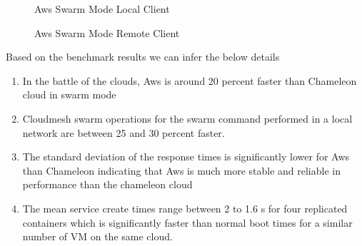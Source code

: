 \documentclass[9pt,twocolumn,twoside]{../../styles/osajnl}
\begin{document}
\begin{figure}[h]
\centering
{}
\caption{Aws Swarm Mode Local Client}
\label{fig:Aws-Swarm-Mode-Local-Client}
\end{figure}


\begin{figure}[h]
\centering
{}
\caption{Aws Swarm Mode Remote Client}
\label{fig:Aws-Swarm-Mode-Remote-Client}
\end{figure}

Based on the benchmark results we can infer the below details
\begin{enumerate}
\item  In the battle of the clouds, Aws is around 20 percent faster than Chameleon cloud in swarm mode
\item  Cloudmesh swarm operations for the swarm command performed in a local network are between
25 and 30  percent faster.
\item The standard deviation of the response times is significantly lower for Aws than Chameleon indicating 
that Aws is much more stable and reliable in performance than the chameleon cloud
\item The mean service create times range between 2 to 1.6 s for four replicated containers 
which is significantly faster than normal boot times for a similar number of VM on the same cloud.
\end{enumerate}
\end{document}

